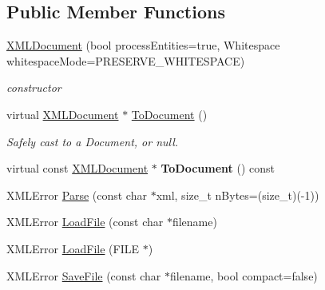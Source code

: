 \subsection*{Public Member Functions}
\begin{DoxyCompactItemize}
\item 
\mbox{\label{classtinyxml2_1_1_x_m_l_document_a57ddf17b6e054dda10af98991b1b8f70}} 
\mbox{\hyperlink{classtinyxml2_1_1_x_m_l_document_a57ddf17b6e054dda10af98991b1b8f70}{X\+M\+L\+Document}} (bool process\+Entities=true, Whitespace whitespace\+Mode=P\+R\+E\+S\+E\+R\+V\+E\+\_\+\+W\+H\+I\+T\+E\+S\+P\+A\+CE)
\begin{DoxyCompactList}\small\item\em constructor \end{DoxyCompactList}\item 
\mbox{\label{classtinyxml2_1_1_x_m_l_document_a3e185f880882bd978367bb55937735ec}} 
virtual \mbox{\hyperlink{classtinyxml2_1_1_x_m_l_document}{X\+M\+L\+Document}} $\ast$ \mbox{\hyperlink{classtinyxml2_1_1_x_m_l_document_a3e185f880882bd978367bb55937735ec}{To\+Document}} ()
\begin{DoxyCompactList}\small\item\em Safely cast to a Document, or null. \end{DoxyCompactList}\item 
\mbox{\label{classtinyxml2_1_1_x_m_l_document_a747ab173887d969fe313b4617f968e99}} 
virtual const \mbox{\hyperlink{classtinyxml2_1_1_x_m_l_document}{X\+M\+L\+Document}} $\ast$ {\bfseries To\+Document} () const
\item 
X\+M\+L\+Error \mbox{\hyperlink{classtinyxml2_1_1_x_m_l_document_a1819bd34f540a7304c105a6232d25a1f}{Parse}} (const char $\ast$xml, size\+\_\+t n\+Bytes=(size\+\_\+t)(-\/1))
\item 
X\+M\+L\+Error \mbox{\hyperlink{classtinyxml2_1_1_x_m_l_document_a2ebd4647a8af5fc6831b294ac26a150a}{Load\+File}} (const char $\ast$filename)
\item 
X\+M\+L\+Error \mbox{\hyperlink{classtinyxml2_1_1_x_m_l_document_a5f1d330fad44c52f3d265338dd2a6dc2}{Load\+File}} (F\+I\+LE $\ast$)
\item 
X\+M\+L\+Error \mbox{\hyperlink{classtinyxml2_1_1_x_m_l_document_a73ac416b4a2aa0952e841220eb3da18f}{Save\+File}} (const char $\ast$filename, bool compact=false)

\end{DoxyCompactItemize}
